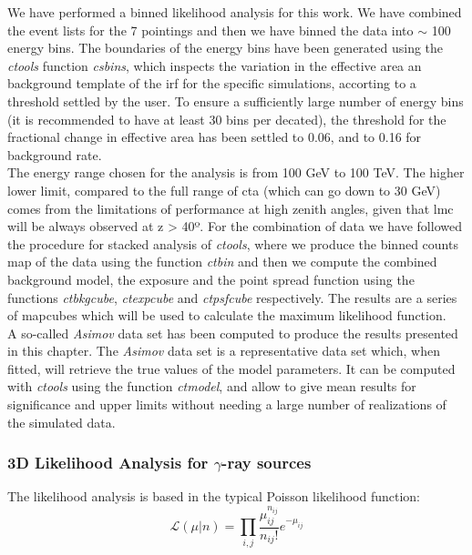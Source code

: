 \documentclass[main.tex]{subfiles}
\begin{document}
We have performed a binned likelihood analysis for this work. We have combined the event lists for the 7 pointings and then we have binned the data into $\sim$ 100 energy bins. The boundaries of the energy bins have been generated using the \textit{ctools} function \textit{csbins}, which inspects the variation in the effective area an background template of the \gls{irf} for the specific simulations, accorting to a threshold settled by the user. To ensure a sufficiently large number of energy bins (it is recommended to have at least 30 bins per decated), the threshold for the fractional change in effective area has been settled to 0.06, and to 0.16 for background rate. \\
The energy range chosen for the analysis is from 100 GeV to 100 TeV. The higher lower limit, compared to the full range of \gls{cta} (which can go down to 30 GeV) comes from the limitations of performance at high zenith angles, given that \gls{lmc} will be always observed at z > 40º.
For the combination of data we have followed the procedure for stacked analysis of \textit{ctools}, where we produce the binned counts map of the data using the function \textit{ctbin} and then we compute the combined background model, the exposure and the point spread function using the functions \textit{ctbkgcube}, \textit{ctexpcube} and \textit{ctpsfcube} respectively. The results are a series of mapcubes which will be used to calculate the maximum likelihood function.\\
A so-called \textit{Asimov} data set has been computed to produce the results presented in this chapter. The \textit{Asimov} data set \cite{2011Asimov} is a representative data set which, when fitted, will retrieve the true values of the model parameters. It can be computed with \textit{ctools} using the function \textit{ctmodel}, and allow to give mean results for significance and upper limits without needing a large number of realizations of the simulated data.

\subsubsection{3D Likelihood Analysis for $\gamma$-ray sources}

The likelihood analysis is based in the typical Poisson likelihood function:
\begin{equation}
  \mathcal{L}(\mu | n) = \prod_{i,j}\frac{\mu_{ij}^{n_{ij}}}{n_{ij}!}e^{-\mu_{ij}}
  \label{eq:likelihood}
\end{equation}
\end{document}
